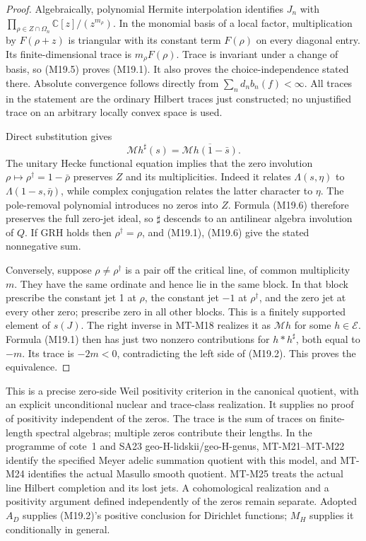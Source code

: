 \begin{proof}
Algebraically, polynomial Hermite interpolation identifies
\(J_n\) with
\(\prod_{\rho\in Z\cap\Omega_n}\mathbb C[z]/(z^{m_\rho})\).
In the monomial basis of a local factor, multiplication by
\(F(\rho+z)\) is triangular with its constant term
\(F(\rho)\) on every diagonal entry. Its finite-dimensional
trace is \(m_\rho F(\rho)\). Trace is invariant under a
change of basis, so (M19.5) proves (M19.1). It also proves
the choice-independence stated there. Absolute convergence
follows directly from
\(\sum_n d_n b_n(f)<\infty\). All traces in the statement
are the ordinary Hilbert traces just constructed; no
unjustified trace on an arbitrary locally convex space is used.

Direct substitution gives
\[
 \mathcal Mh^\sharp(s)
       =\overline{\mathcal Mh(1-\bar s)}.              \tag{M19.6}
\]
The unitary Hecke functional equation implies that the zero
involution \(\rho\mapsto\rho^\dagger=1-\bar\rho\)
preserves \(Z\) and its multiplicities. Indeed it relates
\(\Lambda(s,\eta)\) to \(\Lambda(1-s,\bar\eta)\),
while complex conjugation relates the latter character to
\(\eta\). The pole-removal polynomial introduces no zeros
into \(Z\). Formula (M19.6) therefore preserves the full
zero-jet ideal, so \(\sharp\) descends to an antilinear
algebra involution of \(Q\). If GRH holds then \(\rho^\dagger=\rho\),
and (M19.1), (M19.6) give the stated nonnegative sum.

Conversely, suppose \(\rho\ne\rho^\dagger\) is a pair
off the critical line, of common multiplicity \(m\).
They have the same ordinate and hence lie in the same
block. In that block prescribe the constant jet 1 at
\(\rho\), the constant jet \(-1\) at \(\rho^\dagger\),
and the zero jet at every other zero; prescribe zero in
all other blocks. This is a finitely supported element
of \(s(J)\). The right inverse in MT-M18 realizes it as
\(\mathcal Mh\) for some \(h\in\mathcal E\). Formula
(M19.1) then has just two nonzero contributions for
\(h*h^\sharp\), both equal to \(-m\). Its trace is
\(-2m<0\), contradicting the left side of (M19.2).
This proves the equivalence.
\end{proof}

This is a precise zero-side Weil positivity criterion in
the canonical quotient, with an explicit unconditional
nuclear and trace-class realization. It supplies no proof
of positivity independent of the zeros. The trace is the
sum of traces on finite-length spectral algebras; multiple
zeros contribute their lengths. In the programme of
cote~1 and SA23 geo-H-lidskii/geo-H-genus, MT-M21--MT-M22 identify the specified Meyer adelic summation
quotient with this model, and MT-M24 identifies the actual
Masullo smooth quotient. MT-M25 treats the actual line Hilbert
completion and its lost jets. A cohomological realization and
a positivity argument defined independently of the zeros remain separate. Adopted \(A_D\)
supplies (M19.2)'s positive conclusion for Dirichlet
functions; \(M_H\) supplies it conditionally in general.

